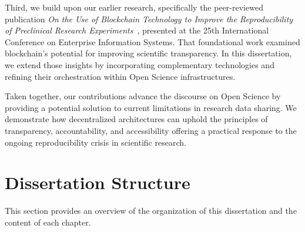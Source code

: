 \documentclass[final]{rc-book-2.14}
\begin{document}
Third, we build upon our earlier research, specifically the peer-reviewed publication \textit{On the Use of Blockchain Technology to Improve the Reproducibility of Preclinical Research Experiments}~\cite{oliveira2023blockchain}, presented at the 25th International Conference on Enterprise Information Systems. That foundational work examined blockchain’s potential for improving scientific transparency. In this dissertation, we extend those insights by incorporating complementary technologies and refining their orchestration within Open Science infrastructures.

Taken together, our contributions advance the discourse on Open Science by providing a potential solution to current limitations in research data sharing. We demonstrate how decentralized architectures can uphold the principles of transparency, accountability, and accessibility offering a practical response to the ongoing reproducibility crisis in scientific research.


\section{Dissertation Structure}
\label{chp:intro:sec:structure}

This section provides an overview of the organization of this dissertation and the content of each chapter.
\end{document}
